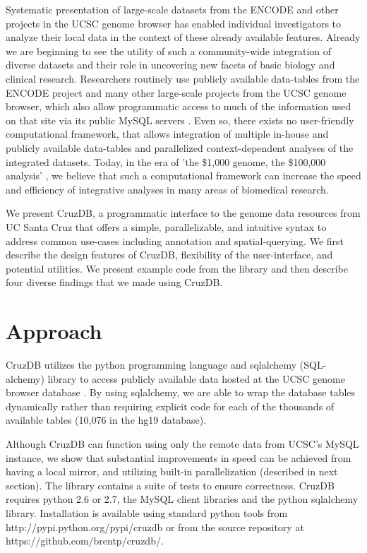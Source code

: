 \documentclass{bioinfo}
\begin{document}
Systematic presentation of large-scale datasets from the ENCODE \citep{ENCODE} and other projects in the UCSC genome browser \citep{KentBrowser} has enabled individual investigators to analyze their local data in the context of these already available features. Already we are beginning to see the utility of such a community-wide integration of diverse datasets and their role in uncovering new facets of basic biology and clinical research. Researchers routinely use publicly available data-tables from the ENCODE project and many other large-scale projects from the UCSC genome browser, which also allow programmatic access to much of the information used on that site via its public MySQL servers \citep{Dreszer}. Even so, there exists no user-friendly computational framework, that allows integration of multiple in-house and publicly available data-tables and parallelized context-dependent analyses of the integrated datasets. Today, in the era of 'the \$1,000 genome, the \$100,000 analysis' \citep{Mardis}, we believe that such a computational framework can increase the speed and efficiency of integrative analyses in many areas of biomedical research. 

We present CruzDB, a programmatic interface to the genome data resources from UC Santa Cruz \citep{Dreszer} that offers a simple, parallelizable, and intuitive syntax to address common use-cases including annotation and spatial-querying. 
We first describe the design features of CruzDB, flexibility of the user-interface, and potential utilities. 
We present example code from the library and then describe four diverse findings that we made using CruzDB.


\section{Approach}

CruzDB utilizes the python programming language and sqlalchemy (SQL-alchemy) library to access publicly available data hosted at the UCSC genome browser database\citep{Dreszer} . By using sqlalchemy, we are able to wrap the database tables dynamically rather than requiring explicit code for each of the thousands of available tables (10,076 in the hg19 database). 

Although CruzDB can function using only the remote data from UCSC's MySQL instance, we show that  substantial improvements in speed can be achieved from having a local mirror, and utilizing built-in parallelization (described in next section). The library contains a suite of tests to ensure correctness. CruzDB requires python 2.6 or 2.7, the MySQL client libraries and the python sqlalchemy library. Installation is available using standard python tools from http://pypi.python.org/pypi/cruzdb or from the source repository at https://github.com/brentp/cruzdb/.
\end{document}
